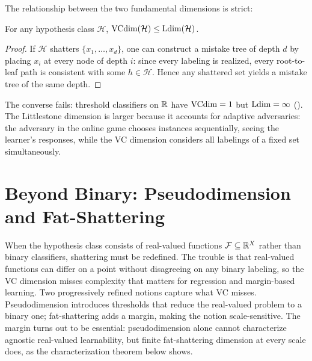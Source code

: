 The relationship between the two fundamental dimensions is strict:

\begin{prop}
\label{prop:vc-leq-ldim-dim}
For any hypothesis class $\mathcal{H}$,
$\mathrm{VCdim}(\mathcal{H}) \leq \mathrm{Ldim}(\mathcal{H})$.
\end{prop}

\begin{proof}
If $\mathcal{H}$ shatters $\{x_1, \ldots, x_d\}$, one can construct a
mistake tree of depth $d$ by placing $x_i$ at every node of depth $i$:
since every labeling is realized, every root-to-leaf path is consistent with
some $h \in \mathcal{H}$.  Hence any shattered set yields a mistake tree of
the same depth.
\end{proof}

The converse fails: threshold classifiers on $\mathbb{R}$ have $\mathrm{VCdim} = 1$ but
$\mathrm{Ldim} = \infty$ ().  The Littlestone dimension is larger
because it accounts for adaptive adversaries: the adversary in the online game
chooses instances sequentially, seeing the learner's responses, while the VC
dimension considers all labelings of a fixed set simultaneously.



\section{Beyond Binary: Pseudodimension and Fat-Shattering}
\label{sec:beyond-binary}

When the hypothesis class consists of real-valued functions
$\mathcal{F} \subseteq \mathbb{R}^X$ rather than binary classifiers, shattering must
be redefined.  The trouble is that real-valued functions can differ on a point
without disagreeing on any binary labeling, so the VC dimension misses
complexity that matters for regression and margin-based learning.
Two progressively refined notions capture what VC misses.  Pseudodimension
introduces thresholds that reduce the real-valued problem to a binary one;
fat-shattering adds a margin, making the notion scale-sensitive.  The margin
turns out to be essential: pseudodimension alone cannot characterize agnostic
real-valued learnability, but finite fat-shattering dimension at every scale
does, as the characterization theorem below shows.


